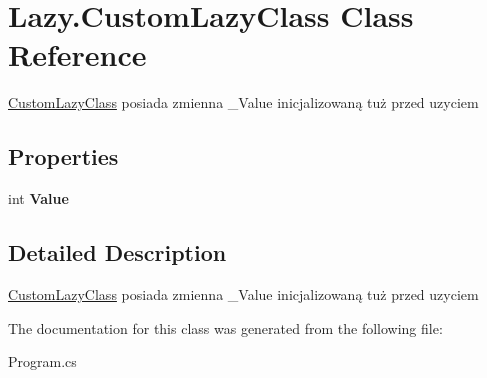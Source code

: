 \hypertarget{class_lazy_1_1_custom_lazy_class}{}\section{Lazy.\+Custom\+Lazy\+Class Class Reference}
\label{class_lazy_1_1_custom_lazy_class}


\hyperlink{class_lazy_1_1_custom_lazy_class}{Custom\+Lazy\+Class} posiada zmienna \+\_\+\+Value inicjalizowaną tuż przed uzyciem  


\subsection*{Properties}
\begin{DoxyCompactItemize}
\item 
\mbox{\label{class_lazy_1_1_custom_lazy_class_a2b1117350681fddf6118a3269d9294ee}} 
int {\bfseries Value}
\end{DoxyCompactItemize}


\subsection{Detailed Description}
\hyperlink{class_lazy_1_1_custom_lazy_class}{Custom\+Lazy\+Class} posiada zmienna \+\_\+\+Value inicjalizowaną tuż przed uzyciem 



The documentation for this class was generated from the following file\+:\begin{DoxyCompactItemize}
\item 
Program.\+cs\end{DoxyCompactItemize}
